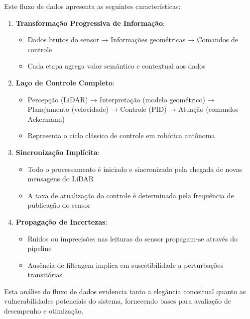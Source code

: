 Este fluxo de dados apresenta as seguintes características:

\begin{enumerate}
    \item \textbf{Transformação Progressiva de Informação}:
          \begin{itemize}
              \item Dados brutos do sensor → Informações geométricas → Comandos de controle
              \item Cada etapa agrega valor semântico e contextual aos dados
          \end{itemize}

    \item \textbf{Laço de Controle Completo}:
          \begin{itemize}
              \item Percepção (LiDAR) → Interpretação (modelo geométrico) → Planejamento
                    (velocidade) → Controle (PID) → Atuação (comandos Ackermann)
              \item Representa o ciclo clássico de controle em robótica autônoma
          \end{itemize}

    \item \textbf{Sincronização Implícita}:
          \begin{itemize}
              \item Todo o processamento é iniciado e sincronizado pela chegada de novas mensagens
                    do LiDAR
              \item A taxa de atualização do controle é determinada pela frequência de publicação
                    do sensor
          \end{itemize}

    \item \textbf{Propagação de Incertezas}:
          \begin{itemize}
              \item Ruídos ou imprecisões nas leituras do sensor propagam-se através do pipeline
              \item Ausência de filtragem implica em suscetibilidade a perturbações transitórias
          \end{itemize}
\end{enumerate}

Esta análise do fluxo de dados evidencia tanto a elegância conceitual quanto as
vulnerabilidades potenciais do sistema, fornecendo bases para avaliação de
desempenho e otimização.

